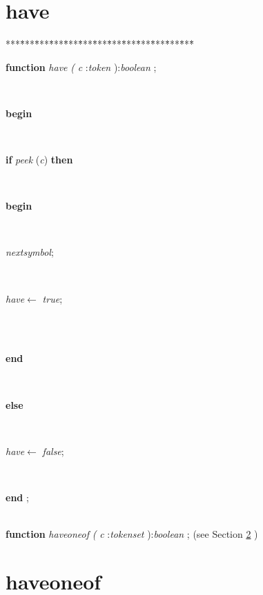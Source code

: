 \section{have}\label{sec:csvfilereader/getdatamatrix/recursedown/recurse/getcolheaders/recurse/getrowheaders/recurse/colcount/getcell/removetrailingnull/onlynulls/rowcount/isint/printcsv/parsecsvfile/thetoken/peek/isoneof/nextsymbolhave}

\begin{tabbing}
***\=***\=***\=***\=***\=***\=***\=***\=***\=***\=***\=***\=***\=\kill
\parbox{14cm}{\textsf{\textbf{function}  \textit{have} \textit{(} \textit{c} :\textit{token} ):\textit{boolean} ;}}\\
\+\parbox{14cm}{\textsf{\textbf{begin} }}\\
\+\parbox{14cm}{\textsf {\textbf {if } \textsf{\textit{peek} (\textit{c})} \textbf{ then } }}\\
\<\parbox{14cm}{\textsf{\textbf{begin} }}\\
\parbox{14cm}{\textsf{\textit{nextsymbol}}; }\\
\parbox{14cm}{\textsf{\textit{have}$\leftarrow$ \textit{true}}; }\\
\\
\<\-\parbox{14cm}{\textsf{\textbf{end} }}\\
\+\parbox{14cm}{\textsf{\textbf{else} }}\\
\-\parbox{14cm}{\textsf{\textit{have}$\leftarrow$ \textit{false}}; }\\
\<\-\parbox{14cm}{\textsf{\textbf{end} ;}}\\
\+\textsf{\textbf{function}  \textit{haveoneof} \textit{(} \textit{c} :\textit{tokenset} ):\textit{boolean} ;} (see Section \ref{sec:csvfilereader/getdatamatrix/recursedown/recurse/getcolheaders/recurse/getrowheaders/recurse/colcount/getcell/removetrailingnull/onlynulls/rowcount/isint/printcsv/parsecsvfile/thetoken/peek/isoneof/nextsymbol/havehaveoneof} )\\
\end{tabbing}
\section{haveoneof}\label{sec:csvfilereader/getdatamatrix/recursedown/recurse/getcolheaders/recurse/getrowheaders/recurse/colcount/getcell/removetrailingnull/onlynulls/rowcount/isint/printcsv/parsecsvfile/thetoken/peek/isoneof/nextsymbol/havehaveoneof}

